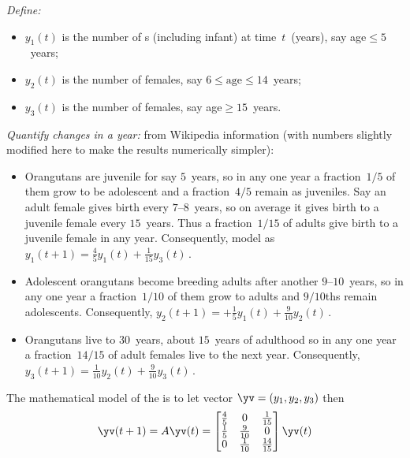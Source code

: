 \begin{example}[orangutans]
\begin{solution}
\emph{Define:}
\begin{itemize}
\item \(y_1(t)\) is the number of  s (including infant) at time~\(t\)~(years), say age\({}\leq5\)~years;
\item \(y_2(t)\) is the number of  females, say \(6\leq\text{age}\leq 14\)~years;
\item \(y_3(t)\) is the number of  females, say age\({}\geq15\)~years.
\end{itemize}
\emph{Quantify changes in a year:} from Wikipedia information (with numbers slightly modified here to make the results numerically simpler):
\begin{itemize}
\item Orangutans are juvenile for say \(5\)~years, so in any one year a fraction~\(1/5\) of them grow to be adolescent and a fraction~\(4/5\) remain as juveniles.
Say an adult female gives birth every \(7\)--\(8\)~years, so on average it gives birth to a juvenile female every \(15\)~years. 
Thus a fraction~\(1/15\) of adults give birth to a juvenile female in any year.
Consequently, model as \({y_1}(t+1)=\tfrac45y_1(t)+\tfrac1{15}y_3(t)\)\,.
\item Adolescent orangutans become breeding adults after another \(9\)--\(10\)~years, so in any one year a fraction~\(1/10\) of them grow to adults and \(9/10\)ths remain adolescents.
Consequently, \({y_2(t+1)}=+\tfrac15y_1(t)+\tfrac9{10}y_2(t)\)\,.
\item Orangutans live to 30~years, about \(15\)~years of adulthood so in any one year a fraction~\(14/15\) of adult females live to the next year.  
Consequently, \({y_3(t+1)}=\tfrac1{10}y_2(t)+\tfrac9{10}y_3(t)\)\,.
\end{itemize}

The mathematical model of the  is to let vector \(\yv=(y_1,y_2,y_3)\) then 
\begin{equation*}
\yv(t+1)=A\yv(t)
=\begin{bmatrix} \frac45&0&\frac1{15}
\\\frac15&\frac9{10}&0
\\0&\frac1{10}&\frac{14}{15} \end{bmatrix}\yv(t)
\end{equation*}


\end{solution}
\end{example}
